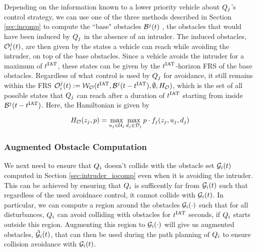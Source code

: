 Depending on the information known to a lower priority vehicle about $Q_j$'s control strategy, we can use one of the three methods described in Section \ref{sec:incomp} to compute the ``base" obstacles $\mathcal{B}^j(t)$ , the obstacles that would have been induced by $Q_j$ in the absence of an intruder. The induced obstacles, $\mathcal{O}_i^j(t)$, are then given by the states a vehicle can reach while avoiding the intruder, on top of the base obstacles. Since a vehicle avoids the intruder for a maximum of $t^\text{IAT}$, these states can be given by the $t^\text{IAT}$-horizon FRS of the base obstacles. Regardless of what control is used by $Q_j$ for avoidance, it still remains within the FRS $\mathcal{O}_i^j(t) := \mathcal{W}_{\mathcal{O}}(t^\text{IAT}, \mathcal{B}^j(t-t^\text{IAT}), \emptyset, H_{\mathcal{O}})$, which is the set of all possible states that $Q_j$ can reach after a duration of $t^\text{IAT}$ starting from inside $\mathcal{B}^j(t-t^\text{IAT})$. Here, the Hamiltonian is given by

\begin{equation}
H_{\mathcal{O}}(z_j, p) = \max_{u_j \in \mathcal{U}_j} \max_{d_j \in \mathcal{D}_j} p \cdot f_j (z_j, u_j, d_j)
\end{equation}
%
%

\subsubsection{Augmented Obstacle Computation \label{sec:intruder_aocomp}}
We next need to ensure that $Q_i$ doesn't collide with the obstacle set $\mathcal{G}_i(t)$ computed in Section \ref{sec:intruder_iocomp} even when it is avoiding the intruder. This can be achieved by ensuring that $Q_i$ is sufficently far from $\mathcal{G}_i(t)$ such that regardless of the used avoidnace control, it cannot collide with $\mathcal{G}_i(t)$. In particular, we can compute a region around the obstacles $\mathcal{G}_i(\cdot)$ such that for all disturbances, $Q_i$ can avoid colliding with obstacles for $t^\text{IAT}$ seconds, if $Q_i$ starts outside this region. Augmenting this region to $\mathcal{G}_i(\cdot)$ will give us augmented obstacles, $\tilde{\mathcal{G}}_i(t)$, that can then be used during the path planning of $Q_i$ to ensure collision avoidance with $\mathcal{G}_i(t)$.  

